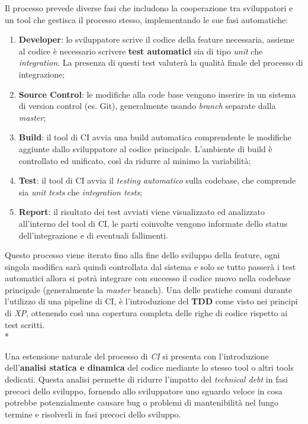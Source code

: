 \documentclass[a4paper,12pt]{report}
\begin{document}
					Il processo prevede diverse fasi che includono la cooperazione tra sviluppatori e un tool che gestisca il processo stesso, implementando le sue fasi automatiche:
					\begin{enumerate}
					    \item \textbf{Developer}: lo sviluppatore scrive il codice della feature necessaria, assieme al codice è necessario scrivere \textbf{test automatici} sia di tipo \emph{unit} che \emph{integration}. La presenza di questi test valuterà la qualità finale del processo di integrazione;
					    \item \textbf{Source Control}: le modifiche alla code base vengono inserire in un sistema di version control (es. Git), generalmente usando \emph{branch} separate dalla \emph{master};
					    \item \textbf{Build}: il tool di CI avvia una build automatica comprendente le modifiche aggiunte dallo sviluppatore al codice principale. L'ambiente di build è controllato ed unificato, così da ridurre al minimo la variabilità;
					    \item \textbf{Test}: il tool di CI avvia il \emph{testing automatico} sulla codebase, che comprende sia \emph{unit tests} che \emph{integration tests};
					    \item \textbf{Report}: il risultato dei test avviati viene visualizzato ed analizzato all'interno del tool di CI, le parti coinvolte vengono informate dello status dell'integrazione e di eventuali fallimenti.
					\end{enumerate}
					
					Questo processo viene iterato fino alla fine dello sviluppo della feature, ogni singola modifica sarà quindi controllata dal sistema e solo se tutto passerà i test automatici allora si potrà integrare con successo il codice nuovo nella codebase principale (generalmente la \emph{master} branch). Una delle pratiche comuni durante l'utilizzo di una pipeline di CI, è l'introduzione del \textbf{TDD} come visto nei principi di \emph{XP}, ottenendo così una copertura completa delle righe di codice rispetto ai test scritti.\\*
					
					Una estensione naturale del processo di \emph{CI} si presenta con l'introduzione dell'\textbf{analisi statica e dinamica} del codice mediante lo stesso tool o altri tools dedicati. Questa analisi permette di ridurre l'impatto del \emph{technical debt} in fasi precoci dello sviluppo, fornendo allo sviluppatore uno sguardo veloce in cosa potrebbe potenzialmente causare bug o problemi di mantenibilità nel lungo termine e risolverli in fasi precoci dello sviluppo.
				
\end{document}
